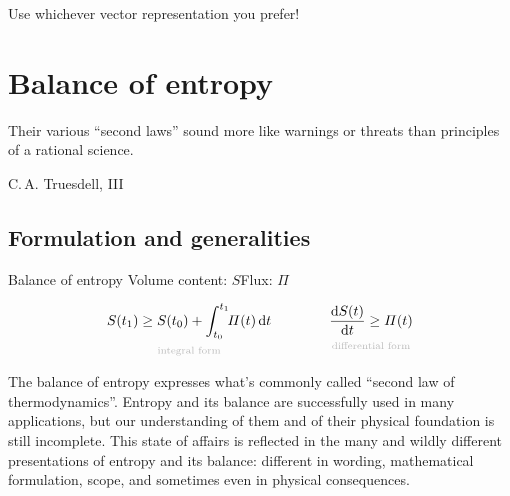 \documentclass[a4paper,12pt,%
onecolumn,oneside,titlepage,%
british%
]{memoir}
\newcommand{\mynotew}[1]{{\footnotesize\color{midgrey}\faIcon{tools}\ #1}}
\newcommand*{\di}{\mathrm{d}}%
\renewcommand*{\|}[1][]{\nonscript\:#1\vert\nonscript\:\mathopen{}}
\newcommand*{\yti}{t_{0}}
\newcommand*{\ytf}{t_{1}}
\newcommand*{\yS}{S}
\newcommand*{\yB}{\varPi}
\begin{document}
Use whichever vector representation you prefer! %

\printpagenotes*
\clearpage
\chapter{Balance of entropy}
\label{cha:bal_entropy}


\epigraph{Their various ``second laws'' sound more like warnings or threats than principles of a rational science.}{C.\,A. Truesdell, III \cites*{truesdell1969_r1984}}

\section{Formulation and generalities}
\label{sec:bal_entropy_formulation}


\begin{definition}{Balance of entropy}
  Volume content: $\yS$\qquad Flux: $\yB$


  \begin{equation}
    \label{eq:bal_entropy}
      \underbracket[0pt]{\yS(\ytf) \ge \yS(\yti) + \int_{\yti}^{\ytf}\!\!\yB(t)\,\di t}_{\mathclap{\text{\color{grey}integral form}}}
      \qquad%
      \qquad
      \underbracket[0pt]{\frac{\di\yS(t)}{\di t} \ge \yB(t)}_{\mathclap{\text{\color{grey}differential form}}}
  \end{equation}
\end{definition}


The balance of entropy expresses what's commonly called \enquote{second law of thermodynamics}. Entropy and its balance are successfully used in many applications, but our understanding of them and of their physical foundation is still incomplete. This state of affairs is reflected in the many and wildly different presentations of entropy and its balance: different in wording, mathematical formulation, scope, and sometimes even in physical consequences.
\end{document}
